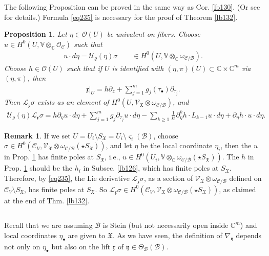 \documentclass[12pt,a4paper,notitlepage]{article}
\theoremstyle{definition}
\newtheorem{rem}[df]{Remark}
\theoremstyle{plain}
\newtheorem{pp}[df]{Proposition}
\newcommand{\fk}{\mathfrak}
\newcommand{\mc}{\mathcal}
\newcommand{\scr}{\mathscr}
\newcommand{\xk}{\mathfrak x}
\newcommand{\yk}{\mathfrak y}
\newcommand{\sgm}{\varsigma}
\newcommand{\SX}{{S_{\fk X}}}
\newcommand{\blt}{\bullet}
\newcommand{\Vbb}{\mathbb V}
\newcommand{\Cbb}{\mathbb C}
\numberwithin{equation}{section}
\begin{document}
The following Proposition can be proved in the same way as Cor. \ref{lb130}. (Or see \cite[Sec. 2.6]{Gui} for details.) Formula \eqref{eq235} is necessary for the proof of Theorem \ref{lb132}.
\begin{pp}\label{lb131}
Let $\eta\in\scr O(U)$ be univalent on fibers. Choose $u\in H^0(U,\Vbb\otimes_\Cbb\scr O_{\mc C})$ such that
\begin{align*}
u\cdot d\eta=\mc U_\varrho(\eta)\sigma\qquad\in H^0(U,\Vbb\otimes_\Cbb\omega_{\mc C/\mc B}).
\end{align*}
Choose $h\in\scr O(U)$ such that if $U$ is identified with $(\eta,\pi)(U)\subset\Cbb\times\Cbb^m$ via $(\eta,\pi)$, then 
\begin{align*}
\xk|_U=h\partial_z+\sum_{j=1}^mg_j(\tau_\blt)\partial_{\tau_j}.
\end{align*}
Then $\mc L_\xk\sigma$ exists as an element of $H^0(U,\scr V_{\fk X}\otimes\omega_{\mc C/\mc B})$, and
\begin{align}
\mc U_\varrho(\eta)\mc L_\xk\sigma=h\partial_\eta u\cdot d\eta+\sum_{j=1}^m g_j\partial_{\tau_j}u\cdot d\eta-\sum_{k\geq1} \frac 1{k!}\partial_\eta^k h\cdot L_{k-1}u\cdot d\eta+\partial_\eta h\cdot u\cdot d\eta.\label{eq235}
\end{align}
\end{pp}

\begin{rem}
If we set $U=U_i\setminus\SX=U_i\setminus\sgm_i(\mc B)$, choose $\sigma\in H^0(\mc C_V,\scr V_{\fk X}\otimes\omega_{\mc C/\mc B}(\star\SX))$, and let $\eta$ be the local coordinate $\eta_i$, then the $u$ in Prop. \ref{lb131} has finite poles at $\SX$, i.e., $u\in H^0(U_i,\Vbb\otimes_\Cbb\omega_{\mc C/\mc B}(\star\SX))$. The $h$ in Prop. \ref{lb131} should be the $h_i$ in Subsec. \ref{lb126}, which has finite poles at $\SX$. Therefore, by \eqref{eq235},  the Lie derivative $\mc L_\xk\sigma$, as a section of $\scr V_{\fk X}\otimes\omega_{\mc C/\mc B}$ defined on $\mc C_V\setminus\SX$, has finite poles at $\SX$. So $\mc L_\xk\sigma\in H^0(\mc C_V,\scr V_{\fk X}\otimes\omega_{\mc C/\mc B}(\star\SX))$, as claimed at the end of Thm. \ref{lb132}.
\end{rem}
 

\subsection{}

Recall that we are assuming $\mc B$ is Stein (but not necessarily open inside $\Cbb^m$) and local coordinates $\eta_\blt$ are given to $\fk X$. As we have seen, the definition of $\nabla_\yk$ depends not only on $\eta_\blt$ but also on the lift $\xk$ of $\yk\in\Theta_{\mc B}(\mc B)$.
\end{document}
